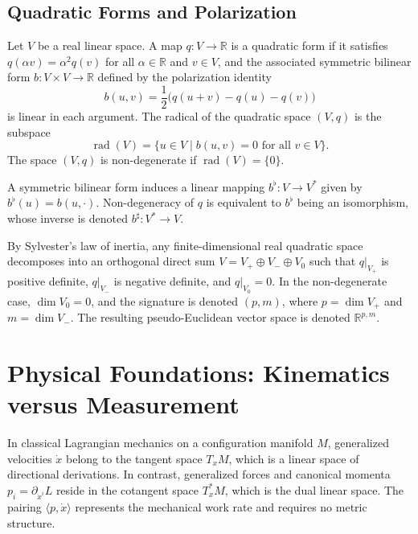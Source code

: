 \documentclass[11pt,a4paper]{article}
\newcommand{\R}{\mathbb{R}}
\newcommand{\rad}{\operatorname{rad}}
\begin{document}
\subsection{Quadratic Forms and Polarization}
\label{subsec:quadratic_forms}

Let $V$ be a real linear space.
A map $q : V \to \R$ is a quadratic form if it satisfies $q(\alpha v) = \alpha^2
q(v)$ for all $\alpha \in \R$ and $v \in V$, and the associated symmetric
bilinear form $b : V \times V \to \R$ defined by the polarization identity
\begin{equation}
  b(u, v) = \frac{1}{2} \bigl( q(u + v) - q(u) - q(v) \bigr)
\end{equation}
is linear in each argument.
The radical of the quadratic space $(V, q)$ is the subspace
\begin{equation}
  \rad(V) = \{ u \in V \mid b(u, v) = 0 \text{ for all } v \in V \}.
\end{equation}
The space $(V, q)$ is non-degenerate if $\rad(V) = \{0\}$.

A symmetric bilinear form induces a linear mapping $b^\flat : V \to V^*$ given
by $b^\flat(u) = b(u, \cdot)$.
Non-degeneracy of $q$ is equivalent to $b^\flat$ being an isomorphism, whose
inverse is denoted $b^\sharp : V^* \to V$.

By Sylvester's law of inertia, any finite-dimensional real quadratic space
decomposes into an orthogonal direct sum $V = V_+ \oplus V_- \oplus V_0$ such
that $q|_{V_+}$ is positive definite, $q|_{V_-}$ is negative definite, and
$q|_{V_0} = 0$.
In the non-degenerate case, $\dim V_0 = 0$, and the signature is denoted $(p,
m)$, where $p = \dim V_+$ and $m = \dim V_-$.
The resulting pseudo-Euclidean vector space is denoted $\R^{p,m}$.

\section{Physical Foundations: Kinematics versus Measurement}
\label{sec:physics}

In classical Lagrangian mechanics on a configuration manifold $M$, generalized
velocities $\dot{x}$ belong to the tangent space $T_x M$, which is a linear
space of directional derivations.
In contrast, generalized forces and canonical momenta $p_i =
\partial_{\dot{x}^i} L$ reside in the cotangent space $T_x^* M$, which is the
dual linear space.
The pairing $\langle p, \dot{x} \rangle$ represents the mechanical work rate and
requires no metric structure.
\end{document}

